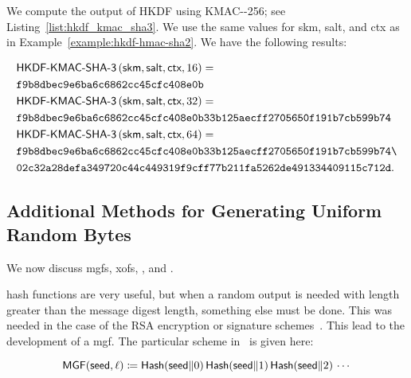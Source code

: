 \begin{example}
\label{example:hkdf-kmac-sha3}

We compute the output of HKDF using KMAC-\ShaThree{}-256;
see Listing~\ref{list:hkdf_kmac_sha3}.
We use the same values for \textsf{skm}, \textsf{salt}, and \textsf{ctx}
as in Example~\ref{example:hkdf-hmac-sha2}.
We have the following results:

\begin{align}
    &\textsf{HKDF-KMAC-\ShaThree{}}\parens{
        \textsf{skm},\textsf{salt},\textsf{ctx}, 16} = \nonumber\\
    &\texttt{f9b8dbec9e6ba6c6862cc45cfc408e0b}
        \nonumber\\
    &\textsf{HKDF-KMAC-\ShaThree{}}\parens{
        \textsf{skm},\textsf{salt},\textsf{ctx}, 32} = \nonumber\\
    &\texttt{f9b8dbec9e6ba6c6862cc45cfc408e0b33b125aecff2705650f191b7cb599b74}
        \nonumber\\
    &\textsf{HKDF-KMAC-\ShaThree{}}\parens{
        \textsf{skm},\textsf{salt},\textsf{ctx}, 64} = \nonumber\\
    &\texttt{f9b8dbec9e6ba6c6862cc45cfc408e0b33b125aecff2705650f191b7cb599b74\textbackslash}
        \nonumber\\
    &\texttt{02c32a28defa349720c44c449319f9cff77b211fa5262de491334409115c712d}.
\end{align}


\end{example}

\subsection{Additional Methods for Generating Uniform Random Bytes}
\label{app:crypto_additional_uniform_bytes}

We now discuss \glspl{mgf}, \glspl{xof}, \ExpandMsgXmd{},
and \ExpandMsgXof{}.

\Glspl{hash function} are very useful,
but when a random output is needed with length greater than
the message digest length, something else must be done.
This was needed in the case of the RSA
encryption or signature schemes~\cite{cryptoeprint:2006/223,rfc8017}.
This lead to the development of a \gls{mgf}.
The particular scheme in~\cite{rfc8017} is given here:

\begin{equation}
    \textsf{MGF}(\textsf{seed}, \ell) \coloneqq{}
        \textsf{Hash}(\textsf{seed}\|0)\,
        \textsf{Hash}(\textsf{seed}\|1)\,
        \textsf{Hash}(\textsf{seed}\|2)\,\cdots
\end{equation}

